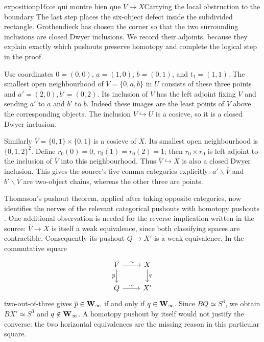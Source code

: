 \begin{dcomment}{exposition}{p16:ce qui montre bien que $V \longrightarrow X$}{Carrying the local obstruction to the boundary}
The last step places the six-object defect inside the subdivided rectangle. Grothendieck has chosen the corner so that the two surrounding inclusions are closed Dwyer inclusions. We record their adjoints, because they explain exactly which pushouts preserve homotopy and complete the logical step in the proof.

Use coordinates $0=(0,0)$, $a=(1,0)$, $b=(0,1)$, and $t_1=(1,1)$. The smallest open neighbourhood of $V=\{0,a,b\}$ in $U$ consists of these three points and $a'=(2,0), b'=(0,2)$. Its inclusion of $V$ has the left adjoint fixing $V$ and sending $a'$ to $a$ and $b'$ to $b$. Indeed these images are the least points of $V$ above the corresponding objects. The inclusion $V\hookrightarrow U$ is a cosieve, so it is a closed Dwyer inclusion.

Similarly $\overline V=\{0,1\}\times\{0,1\}$ is a cosieve of $X$. Its smallest open neighbourhood is $\{0,1,2\}^2$. Define $r_0(0)=0$, $r_0(1)=r_0(2)=1$; then $r_0\times r_0$ is left adjoint to the inclusion of $\overline V$ into this neighbourhood. Thus $\overline V\hookrightarrow X$ is also a closed Dwyer inclusion. This gives the source's five comma categories explicitly: $a'\backslash\overline V$ and $b'\backslash\overline V$ are two-object chains, whereas the other three are points.

Thomason's pushout theorem, applied after taking opposite categories, now identifies the nerves of the relevant categorical pushouts with homotopy pushouts \citep[Proposition~4.3 and Corollary~4.4]{Thomason1980}. One additional observation is needed for the reverse implication written in the source: $\overline V\to X$ is itself a weak equivalence, since both classifying spaces are contractible. Consequently its pushout $Q\to X'$ is a weak equivalence. In the commutative square
\[
\begin{tikzcd}
\overline V\arrow[r,"\sim"]\arrow[d,"\overline p"']&X\arrow[d,"q"]\\
Q\arrow[r,"\sim"]&X'
\end{tikzcd}
\]
two-out-of-three gives $\overline p\in\mathbf{W}_{\infty}$ if and only if $q\in\mathbf{W}_{\infty}$. Since $BQ\simeq S^3$, we obtain $BX'\simeq S^3$ and $q\notin\mathbf{W}_{\infty}$. A homotopy pushout by itself would not justify the converse: the two horizontal equivalences are the missing reason in this particular square.


\end{dcomment}

